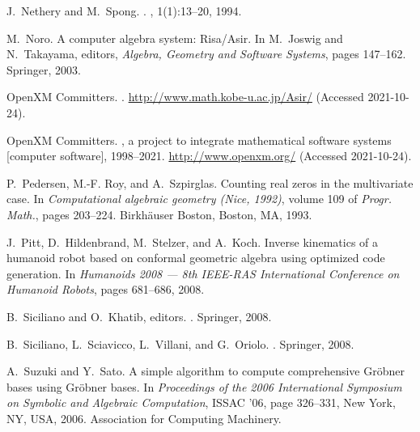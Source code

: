\documentclass{birkjour}
\theoremstyle{plain}
\theoremstyle{definition}
\begin{document}
\begin{thebibliography}{10}
        J.~Nethery and M.~Spong.
        .
        , 1(1):13--20, 1994.

        M.~Noro.
        \newblock A computer algebra system: {Risa/Asir}.
        \newblock In M.~Joswig and N.~Takayama, editors, {\em Algebra, Geometry and
        Software Systems}, pages 147--162. Springer, 2003.

        {OpenXM Committers}.
        .
        \newblock \url{http://www.math.kobe-u.ac.jp/Asir/} (Accessed 2021-10-24).

        {OpenXM Committers}.
        , a project to integrate mathematical software systems
        [computer software], 1998--2021.
        \newblock \url{http://www.openxm.org/} (Accessed 2021-10-24).

        P.~Pedersen, M.-F. Roy, and A.~Szpirglas.
        \newblock Counting real zeros in the multivariate case.
        \newblock In {\em Computational algebraic geometry ({N}ice, 1992)}, volume 109
        of {\em Progr. Math.}, pages 203--224. Birkh\"{a}user Boston, Boston, MA,
        1993.

        J.~Pitt, D.~Hildenbrand, M.~Stelzer, and A.~Koch.
        \newblock Inverse kinematics of a humanoid robot based on conformal geometric
        algebra using optimized code generation.
        \newblock In {\em Humanoids 2008 --- 8th IEEE-RAS International Conference on
        Humanoid Robots}, pages 681--686, 2008.

        B.~Siciliano and O.~Khatib, editors.
        .
        \newblock Springer, 2008.

        B.~Siciliano, L.~Sciavicco, L.~Villani, and G.~Oriolo.
        .
        \newblock Springer, 2008.

        A.~Suzuki and Y.~Sato.
        \newblock A simple algorithm to compute comprehensive {Gr\"{o}bner} bases using
        {Gr\"{o}bner} bases.
        \newblock In {\em Proceedings of the 2006 International Symposium on Symbolic
        and Algebraic Computation}, ISSAC '06, page 326–331, New York, NY, USA,
        2006. Association for Computing Machinery.


\end{thebibliography}
\end{document}
